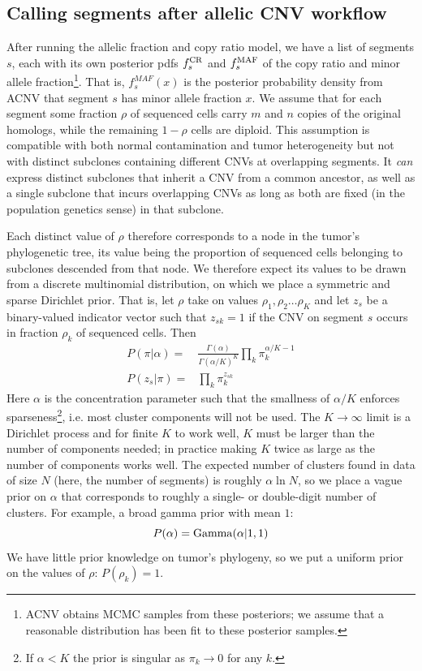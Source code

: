 \documentclass[nofootinbib,amssymb,amsmath]{revtex4}
\begin{document}
\subsection{Calling segments after allelic CNV workflow} \label{ACNV-caller}
After running the allelic fraction and copy ratio model, we have a list of segments $s$, each with its own posterior pdfs $f_s^{\rm CR}$ and $f_s^{\rm MAF}$ of the copy ratio and minor allele fraction\footnote{ACNV obtains MCMC samples from these posteriors; we assume that a reasonable distribution has been fit to these posterior samples.}.  That is, $f_s^{MAF}(x)$ is the posterior probability density from ACNV that segment $s$ has minor allele fraction $x$.  We assume that for each segment some fraction $\rho$ of sequenced cells carry $m$ and $n$ copies of the original homologs, while the remaining $1 - \rho$ cells are diploid.  This assumption is compatible with both normal contamination and tumor heterogeneity but not with distinct subclones containing different CNVs at overlapping segments.  It \textit{can} express distinct subclones that inherit a CNV from a common ancestor, as well as a single subclone that incurs overlapping CNVs as long as both are fixed (in the population genetics sense) in that subclone.

Each distinct value of $\rho$ therefore corresponds to a node in the tumor's phylogenetic tree, its value being the proportion of sequenced cells belonging to subclones descended from that node.  We therefore expect its values to be drawn from a discrete multinomial distribution, on which we place a symmetric and sparse Dirichlet prior.  That is, let $\rho$ take on values $\rho_1, \rho_2 \ldots \rho_K$ and let $z_s$ be a binary-valued indicator vector such that $z_{sk} = 1$ if the CNV on segment $s$ occurs in fraction $\rho_k$ of sequenced cells.  Then
\begin{align} 
P(\pi | \alpha) =& \frac{ \Gamma(\alpha) }{\Gamma(\alpha/K)^K} \prod_k \pi_k^{\alpha/K - 1} \\
P(z_s | \pi) =& \prod_k \pi_k^{z_{sk}}
\end{align}
Here $\alpha$ is the concentration parameter such that the smallness of $\alpha / K$ enforces sparseness\footnote{If $\alpha < K$ the prior is singular as $\pi_k \rightarrow 0$ for any $k$.}, i.e. most cluster components will not be used.  The $K \rightarrow \infty$ limit is a Dirichlet process and for finite $K$ to work well, $K$ must be larger than the number of components needed; in practice making $K$ twice as large as the number of components works well.  The expected number of clusters found in data of size $N$ (here, the number of segments) is roughly $\alpha \ln N$, so we place a vague prior on $\alpha$ that corresponds to roughly a single- or double-digit number of clusters.  For example, a broad gamma prior with mean $1$:
%
\begin{equation}
P(\alpha) = {\rm Gamma}(\alpha | 1,1)
\end{equation}
%
We have little prior knowledge on tumor's phylogeny, so we put a uniform prior on the values of $\rho$: $P(\rho_k) = 1$.
\end{document}
